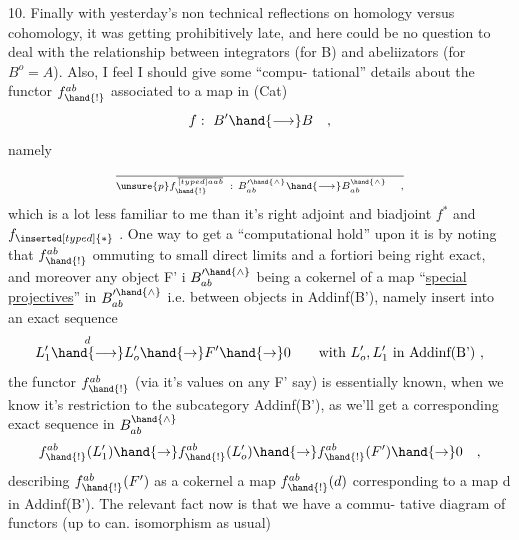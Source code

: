 10.  Finally with yesterday's non technical reflections on homology
versus cohomology,  it was getting prohibitively late,  and here could be
no question to deal with the relationship between integrators  (for B)
and abeliizators (for $B^{o}=A$).  Also,  I feel I should give some ``compu-%
tational'' details about the functor $f_{\hand{!}}^{ab}$  associated to a map in (Cat)
\[ f:\ B' \hand{\longrightarrow} B \quad , \]
namely
\[ \over{\unsure{p}}{f}_{\hand{!}}^{\over[typed]{a}{a}b} \ :\ B'^{\hand{\wedge}}_{ab} \hand{\longrightarrow} B^{\hand{\wedge}}_{ab} \quad , \]
which is a lot less familiar to me than it's right adjoint and biadjoint
$f^{*}$ and $f_{\inserted[typed]{*}}$ .  One way to get a ``computational hold'' upon it is by noting
that $f_{\hand{!}}^{ab}$ ommuting to small direct limits and a fortiori being right
exact,  and moreover any object F' i $B'^{\hand{\wedge}}_{ab}$  being a cokernel of a map
  ``\uline{special} \uline{projectives}'' in $B'^{\hand{\wedge}}_{ab}$  i.e.  between objects in
 Addinf(B'), namely insert into an exact sequence
\[ L'_{1} \overset{d}{\hand{\longrightarrow}} L'_{o} \hand{\to} F' \hand{\to} 0 \qquad \text{with } L'_{o},L'_{1} \text{ in Addinf(B')} \ , \]
the functor $f_{\hand{!}}^{ab}$ (via it's values on any F' say)  is essentially known,
when we know it's restriction to the subcategory Addinf(B'),  as we'll
get a corresponding exact sequence in $B^{\hand{\wedge}}_{ab}$
\[ f_{\hand{!}}^{ab}(L'_{1}) \hand{\to} f_{\hand{!}}^{ab}(L'_{o}) \hand{\to} f_{\hand{!}}^{ab}(F') \hand{\to} 0 \quad , \]
describing $f_{\hand{!}}^{ab}(F')$ as a cokernel  a map   $f_{\hand{!}}^{ab}(d)$  corresponding
to a map d in Addinf(B').  The relevant fact now is that we have a commu-%
tative diagram of functors (up to can. isomorphism as usual)


